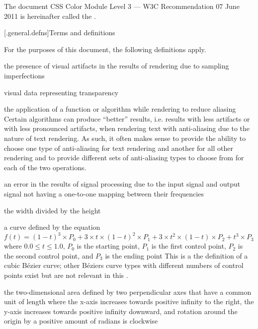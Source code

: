 \pnum
The document CSS Color Module Level 3 --- W3C Recommendation 07 June 2011 is 
hereinafter called the .

[\iotwod.general.defns]{Terms and definitions}

\pnum
{}%
For the purposes of this document, the following definitions apply.

the presence of visual artifacts in the results of rendering due to 
sampling imperfections

visual data representing transparency

the application of a function or algorithm while rendering to 
reduce aliasing
\enternote
Certain algorithms can produce ``better'' results, i.e. results with less 
artifacts or with less pronounced artifacts, when rendering text with 
anti-aliasing due to the nature of text rendering. As such, it often makes 
sense to provide the ability to choose one type of anti-aliasing for text 
rendering and another for all other rendering and to provide different sets of 
anti-aliasing types to choose from for each of the two operations.
\exitnote

an error in the results of signal processing due to the input signal and output 
signal not having a one-to-one mapping between their frequencies

the width divided by the height

a curve defined by the 
equation $f(t) = (1 - t)^{3} \times P_{0} + 3 \times t \times (1 - t)^{2} 
\times P_{1} + 3 \times t^{2} \times (1 - t) \times P_{2} + t^{3} \times P_{3}$ 
where $0.0 \le t \le 1.0$, $P_{0}$ is the starting point, $P_{1}$ is the first 
control point, $P_{2}$ is the second control point, and $P_{3}$ is the 
ending point
\enternote
This is a the definition of a cubic B\'ezier curve; other B\'eziers curve types 
with different numbers of control points exist but are not relevant in this 
\documenttypename.
\exitnote

the two-dimensional area defined by two perpendicular axes that have a common 
unit of length where the x-axis increases towards positive infinity to the 
right, the y-axis increases towards positive infinity downward, and rotation 
around the origin by a positive amount of radians is clockwise

